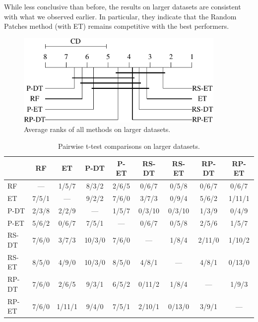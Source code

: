 While less conclusive than before, the results on larger datasets are
consistent with what we observed earlier. In particular, they indicate that
the Random Patches method (with ET) remains competitive with the best
performers.

\begin{figure}
    \centering
    \includegraphics[width=0.9\textwidth]{figures/ch8_rank_large.pdf}
    \caption{Average ranks of all methods on larger datasets.}
    \label{fig:8:large-cmp}
\end{figure}

\begin{table}
    \centering
    \footnotesize
  \begin{tabular}{|l|cccccccc|}
    \hline
         & RF & ET & P-DT & P-ET & RS-DT & RS-ET & RP-DT & RP-ET \\
    \hline
    \hline
                RF     & ---    & 1/5/7   & 8/3/2  & 2/6/5  & 0/6/7  & 0/5/8  & 0/6/7  & 0/6/7 \\
                ET     & 7/5/1   & ---    & 9/2/2  & 7/6/0  & 3/7/3  & 0/9/4  & 5/6/2  & 1/11/1 \\
                P-DT   & 2/3/8   & 2/2/9   & ---   & 1/5/7  & 0/3/10 & 0/3/10 & 1/3/9  & 0/4/9 \\
                P-ET   & 5/6/2   & 0/6/7   & 7/5/1  & ---   & 0/6/7  & 0/5/8  & 2/5/6  & 1/5/7 \\
                RS-DT  & 7/6/0   & 3/7/3   & 10/3/0 & 7/6/0  & ---   & 1/8/4  & 2/11/0 & 1/10/2 \\
                RS-ET  & 8/5/0   & 4/9/0   & 10/3/0 & 8/5/0  & 4/8/1  & ---   & 4/8/1  & 0/13/0 \\
                RP-DT  & 7/6/0   & 2/6/5   & 9/3/1  & 6/5/2  & 0/11/2 & 1/8/4  & ---   & 1/9/3 \\
                RP-ET  & 7/6/0   & 1/11/1  & 9/4/0  & 7/5/1  & 2/10/1 & 0/13/0 & 3/9/1  & ---\\
    \hline
    \end{tabular}
    \caption{Pairwise t-test comparisons on larger datasets.}
    \label{table:rp:large-ttest}
\end{table}

